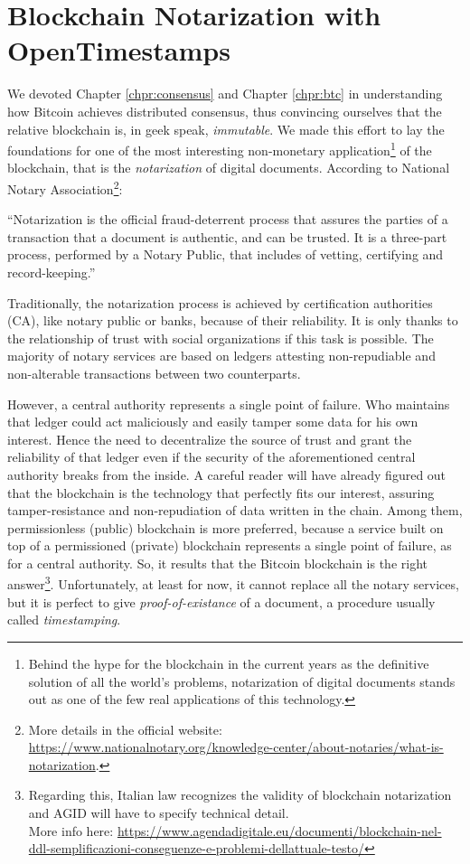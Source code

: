 \chapter{Blockchain Notarization with OpenTimestamps}

We devoted Chapter \ref{chpr:consensus} and Chapter \ref{chpr:btc} in understanding how Bitcoin achieves distributed consensus, thus convincing ourselves that the relative blockchain is, in geek speak, \textit{immutable}. We made this effort to lay the foundations for one of the most interesting non-monetary application\footnote{Behind the hype for the blockchain in the current years as the definitive solution of all the world's problems, notarization of digital documents stands out as one of the few real applications of this technology.} of the blockchain, that is the \textit{notarization} of digital documents. According to National Notary Association\footnote{More details in the official website: \url{https://www.nationalnotary.org/knowledge-center/about-notaries/what-is-notarization}.}:

\bigskip
\noindent
\enquote{Notarization is the official fraud-deterrent process that assures the parties of a transaction that a document is authentic, and can be trusted. It is a three-part process, performed by a Notary Public, that includes of vetting, certifying and record-keeping.}

\bigskip
\noindent
Traditionally, the notarization process is achieved by certification authorities (CA), like notary public or banks, because of their reliability. It is only thanks to the relationship of trust with social organizations if this task is possible. The majority of notary services are based on ledgers attesting non-repudiable and non-alterable transactions between two counterparts.

\bigskip
\noindent
However, a central authority represents a single point of failure. Who maintains that ledger could act maliciously and easily tamper some data for his own interest. Hence the need to decentralize the source of trust and grant the reliability of that ledger even if the security of the aforementioned central authority breaks from the inside. A careful reader will have already figured out that the blockchain is the technology that perfectly fits our interest, assuring tamper-resistance and non-repudiation of data written in the chain. Among them, permissionless (public) blockchain is more preferred, because a service built on top of a permissioned (private) blockchain represents a single point of failure, as for a central authority. So, it results that the Bitcoin blockchain is the right answer\footnote{Regarding this, Italian law recognizes the validity of blockchain notarization and AGID will have to specify technical detail. \\ More info here: \url{https://www.agendadigitale.eu/documenti/blockchain-nel-ddl-semplificazioni-conseguenze-e-problemi-dellattuale-testo/}}. Unfortunately, at least for now, it cannot replace all the notary services, but it is perfect to give \textit{proof-of-existance} of a document, a procedure usually called \textit{timestamping}.

